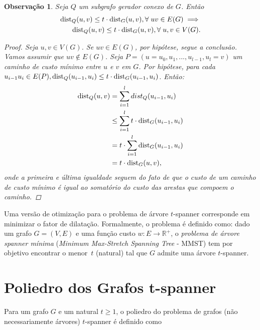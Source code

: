 \documentclass[11pt,reqno]{amsart}
\newcommand{\dist}{{\rm dist}}
\newtheorem{observacao}{Observação}
\begin{document}
\begin{observacao}
\label{obs:relate_spanner_definitions}
Seja $Q$ um subgrafo gerador conexo de $G$. Então
\begin{equation*}
\begin{split}
\dist_{Q}(u,v) \le t \cdot \dist_{G}(u,v), \forall\;uv \in E(G) \implies \\
\dist_{Q}(u,v) \le t \cdot \dist_{G}(u,v), \forall\;u,v \in V(G).
\end{split}
\end{equation*}
\begin{proof}
Seja $u,v \in V(G)$. Se $uv \in E(G)$, por hipótese, segue a conclusão. 
Vamos assumir que $uv \notin E(G)$. Seja 
$P = (u = u_0, u_1, ..., u_{l-1}, u_l = v)$ um caminho de custo mínimo entre 
$u$ e $v$ em $G$. Por hipótese, para cada \\
\mbox{$u_{i-1}u_i \in E(P), \dist_{Q}(u_{i-1},u_i) \le t \cdot \dist_{G}(u_{i-1},u_i)$}.
 Então: 
\begin{align*}
\dist_{Q}(u,v) &= \sum_{i = 1}^{l} dist_{Q}(u_{i-1},u_i)\\ 
&\le \sum_{i = 1}^{l}t \cdot \dist_{G}(u_{i-1},u_i)\\
&= t \cdot \sum_{i = 1}^{l} \dist_{G}(u_{i-1},u_i)\\
&= t \cdot \dist_{G}(u,v),
\end{align*}
onde a primeira e última igualdade seguem do fato de que o custo de um 
caminho de custo mínimo é igual ao somatório do custo das arestas que compoem o 
caminho.
\end{proof}
\end{observacao}

Uma versão de otimização para o problema de árvore \hbox{$t$-spanner}
corresponde em minimizar o fator de dilatação. Formalmente, o problema
é definido como: dado um grafo $G=(V,E)$ e uma 
função custo $w: E \to \mathbb{R}^+$, o \emph{problema de árvore spanner mínima}
(\emph{Minimum Max-Stretch Spanning Tree} - MMST) tem por objetivo
encontrar o menor~$t$ (natural) tal que $G$ admite uma árvore
$t$-spanner. 

\section{Poliedro dos Grafos t-spanner}
Para um grafo $G$ e um natural $t \ge 1$, o poliedro do problema de grafos (não 
necessariamente árvores) $t$-spanner é definido como 

\end{document}
